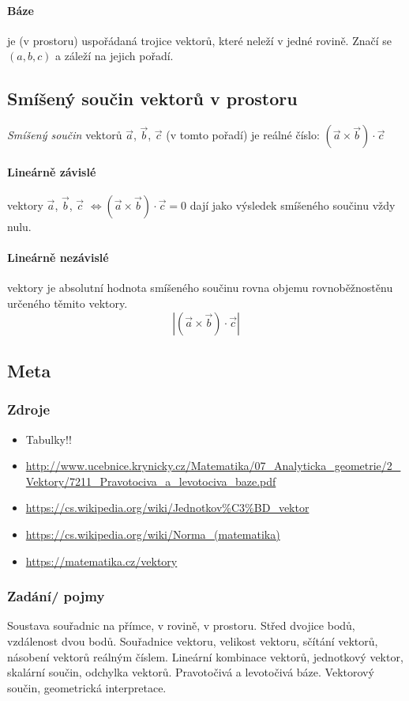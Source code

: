 \documentclass[12pt]{article}
\begin{document}
\paragraph{Báze} je (v prostoru) uspořádaná trojice vektorů, které neleží v jedné rovině. Značí se $(a,b,c)$ a záleží na jejich pořadí.

\subsection{Smíšený součin vektorů v prostoru}
\emph{Smíšený součin} vektorů  $\vec{a}$, $\vec{b}$, $\vec{c}$ (v tomto pořadí) je reálné číslo: $\left(\vec{a} \times \vec{b} \right)\cdot \vec{c}$
\paragraph{Lineárně závislé} vektory $\vec{a}$, $\vec{b}$, $\vec{c}$ $\iff \left(\vec{a} \times \vec{b} \right)\cdot \vec{c} =0$ dají jako výsledek smíšeného součinu vždy nulu.
\paragraph{Lineárně nezávislé} vektory je absolutní hodnota smíšeného součinu rovna objemu rovnoběžnostěnu určeného těmito vektory.
\begin{equation}
\left| (\vec{a} \times \vec{b}) \cdot \vec{c}\right|
\end{equation}

\subsection{Meta}
\subsubsection{Zdroje}
\begin{itemize}
\item Tabulky!!
\item \url{http://www.ucebnice.krynicky.cz/Matematika/07_Analyticka_geometrie/2_Vektory/7211_Pravotociva_a_levotociva_baze.pdf}
\item \url{https://cs.wikipedia.org/wiki/Jednotkov\%C3\%BD_vektor}
\item \url{https://cs.wikipedia.org/wiki/Norma_(matematika)}
\item \url{https://matematika.cz/vektory}
\end{itemize}
\subsubsection{Zadání/ pojmy}
Soustava souřadnic na přímce, v rovině, v prostoru. Střed dvojice bodů, vzdálenost dvou bodů. Souřadnice vektoru, velikost vektoru, sčítání vektorů, násobení vektorů reálným číslem. Lineární kombinace vektorů, jednotkový vektor, skalární součin, odchylka vektorů. Pravotočivá a levotočivá báze. Vektorový součin, geometrická interpretace.
\end{document}
